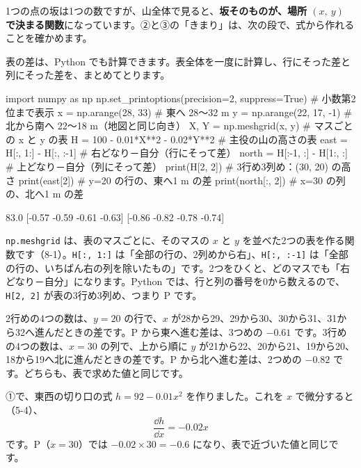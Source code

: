 1つの点の坂は1つの数ですが、山全体で見ると、\textbf{坂そのものが、場所 $(x,\ y)$ で決まる関数}になっています。②と③の「きまり」は、次の段で、式から作れることを確かめます。

表の差は、Python でも計算できます。表全体を一度に計算し、行にそった差と列にそった差を、まとめてとります。
\begin{bkcode}[Python]
import numpy as np
np.set\_printoptions(precision=2, suppress=True)  \# 小数第2位まで表示
x = np.arange(28, 33)            \# 東へ 28〜32 m
y = np.arange(22, 17, -1)        \# 北から南へ 22〜18 m（地図と同じ向き）
X, Y = np.meshgrid(x, y)         \# マスごとの x と y の表
H = 100 - 0.01*X**2 - 0.02*Y**2  \# 主役の山の高さの表
east = H[:, 1:] - H[:, :-1]      \# 右どなり－自分（行にそって差）
north = H[:-1, :] - H[1:, :]     \# 上どなり－自分（列にそって差）
print(H[2, 2])                   \# 3行め3列め：(30, 20) の高さ
print(east[2])                   \# y=20 の行の、東へ1 m の差
print(north[:, 2])               \# x=30 の列の、北へ1 m の差
\end{bkcode}
\begin{bkcodeout}[実行結果]
83.0
[-0.57 -0.59 -0.61 -0.63]
[-0.86 -0.82 -0.78 -0.74]
\end{bkcodeout}
\texttt{np.meshgrid} は、表のマスごとに、そのマスの $x$ と $y$ を並べた2つの表を作る関数です（8-1）。\texttt{H[:, 1:]} は「全部の行の、2列めから右」、\texttt{H[:, :-1]} は「全部の行の、いちばん右の列を除いたもの」です。2つをひくと、どのマスでも「右どなり－自分」になります。Python では、行と列の番号を0から数えるので、\texttt{H[2, 2]} が表の3行め3列め、つまり P です。

\noindent 2行めの4つの数は、$y=20$ の行で、$x$ が28から29、29から30、30から31、31から32へ進んだときの差です。P から東へ進む差は、3つめの $-0.61$ です。3行めの4つの数は、$x=30$ の列で、上から順に $y$ が21から22、20から21、19から20、18から19へ北に進んだときの差です。P から北へ進む差は、2つめの $-0.82$ です。どちらも、表で求めた値と同じです。




\leavevmode\label{bk:8-2:henbibun}①で、東西の切り口の式 $h=92-0.01x^2$ を作りました。これを $x$ で微分すると（5-4）、
\[ \frac{\dd h}{\dd x}=-0.02x \]
です。P（$x=30$）では $-0.02\times30=-0.6$ になり、表で近づいた値と同じです。

